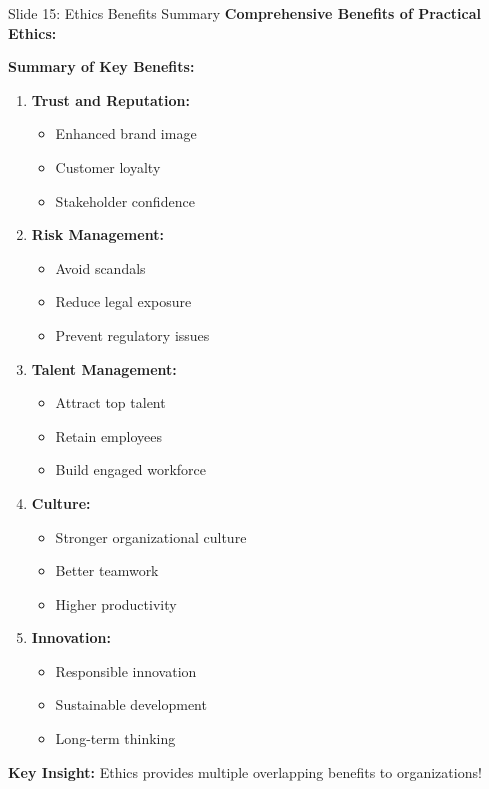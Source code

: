 \documentclass[8pt]{beamer}
\begin{document}
	\begin{frame}{Slide 15: Ethics Benefits Summary}
		\fontsize{6.5}{7.5}\selectfont
		\textbf{Comprehensive Benefits of Practical Ethics:}
		
		\vspace{0.1cm}
		\textbf{Summary of Key Benefits:}
		\begin{enumerate}
			\item \textbf{Trust and Reputation:}
			\begin{itemize}
				\item Enhanced brand image
				\item Customer loyalty
				\item Stakeholder confidence
			\end{itemize}
			\item \textbf{Risk Management:}
			\begin{itemize}
				\item Avoid scandals
				\item Reduce legal exposure
				\item Prevent regulatory issues
			\end{itemize}
			\item \textbf{Talent Management:}
			\begin{itemize}
				\item Attract top talent
				\item Retain employees
				\item Build engaged workforce
			\end{itemize}
			\item \textbf{Culture:}
			\begin{itemize}
				\item Stronger organizational culture
				\item Better teamwork
				\item Higher productivity
			\end{itemize}
			\item \textbf{Innovation:}
			\begin{itemize}
				\item Responsible innovation
				\item Sustainable development
				\item Long-term thinking
			\end{itemize}
		\end{enumerate}
		
		\textcolor{myblue}{\textbf{Key Insight:}} Ethics provides \textcolor{myblue}{multiple overlapping benefits} to organizations!
	\end{frame}
	
\end{document}
